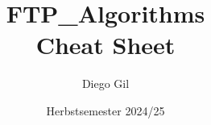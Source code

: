 \documentclass[11pt,a4paper,twocolumn]{article}
\title{\textbf{FTP\_Algorithms}\\
       \large Cheat Sheet}
\author{Diego Gil}
\date{Herbstsemester 2024/25}
\begin{document}
\onecolumn
\maketitle
\begin{multicols}{2}
\tableofcontents
\end{multicols}
\clearpage

\twocolumn

\clearpage


\clearpage



\end{document}

